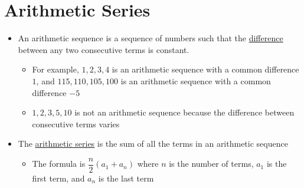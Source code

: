 \documentclass[11pt,letterpaper]{article}
\begin{document}
\begin{minipage}{\textwidth}
     \section*{Arithmetic Series}
     \begin{itemize}
          \item An arithmetic sequence is a sequence of numbers such that the \underline{difference} between any two consecutive terms is constant.
          \begin{itemize}
               \item For example, $1, 2, 3, 4$ is an arithmetic sequence with a common difference $1$, and $115, 110, 105, 100$ is an arithmetic sequence with a common difference $-5$
               \item $1, 2, 3, 5, 10$ is not an arithmetic sequence because the difference between consecutive terms varies
          \end{itemize}
          \item The \underline{arithmetic series} is the sum of all the terms in an arithmetic sequence
          \begin{itemize}
               \item The formula is $\dfrac{n}{2}(a_1+a_n)$ where $n$ is the number of terms, $a_1$ is the first term, and $a_n$ is the last term
          \end{itemize} 
     \end{itemize}

\end{minipage}
\end{document}
